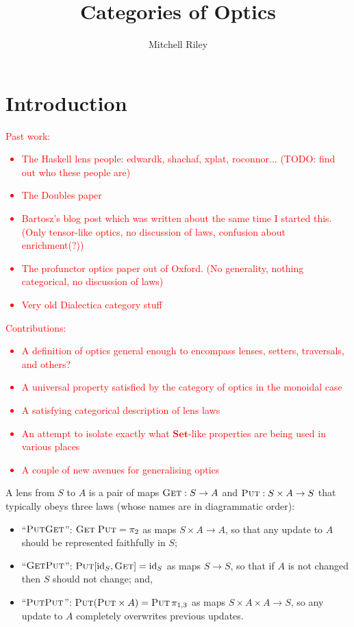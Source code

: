 \documentclass[11pt,a4paper]{article}
\title{Categories of Optics}
\author{Mitchell Riley}
\affil{Wesleyan University \\ \texttt{mvriley@wesleyan.edu}}
\theoremstyle{plain}
\theoremstyle{definition}
\newcommand{\Set}{\mathbf{Set}}
\newcommand{\id}{\mathrm{id}}
\newcommand{\fget}{\textsc{Get}}
\newcommand{\fput}{\textsc{Put}}
\newcommand{\todo}[1]{\textcolor{red}{\small #1}}
\begin{document}
\maketitle

\section{Introduction}

\todo{Past work:
  \begin{itemize}
  \item The Haskell lens people: edwardk, shachaf, xplat, roconnor... (TODO: find out who these people are)
  \item The Doubles paper
  \item Bartosz's blog post which was written about the same time I started this. (Only tensor-like optics, no discussion of laws, confusion about enrichment(?))
  \item The profunctor optics paper out of Oxford. (No generality, nothing categorical, no discussion of laws)
  \item Very old Dialectica category stuff
  \end{itemize}
}

\todo{Contributions:
  \begin{itemize}
  \item A definition of optics general enough to encompass lenses, setters, traversals, and others?
  \item A universal property satisfied by the category of optics in the monoidal case
  \item A satisfying categorical description of lens laws
  \item An attempt to isolate exactly what $\Set$-like properties are being used in various places
  \item A couple of new avenues for generalising optics
  \end{itemize}
}

A lens from $S$ to $A$ is a pair of maps $\fget : S \to A$ and $\fput : S \times A \to S$ that typically obeys three laws (whose names are in diagrammatic order):
\begin{itemize}
\item ``$\fput\fget$'': $\fget \; \fput = \pi_2$ as maps $S \times A \to A$, so that any update to $A$ should be represented faithfully in $S$;
\item ``$\fget\fput$'': $\fput [\id_S, \fget] = \id_S$ as maps $S \to S$, so that if $A$ is not changed then $S$ should not change; and,
\item ``$\fput\fput$'': $\fput (\fput \times A) = \fput \, \pi_{1, 3}$ as maps $S \times A \times A \to S$, so any update to $A$ completely overwrites previous updates.
\end{itemize}
\end{document}
